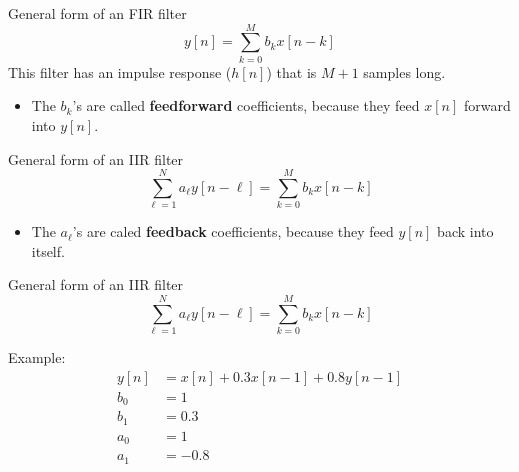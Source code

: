\documentclass{beamer}
\begin{document}
\begin{frame}
  \begin{block}{General form of an FIR filter}
    \[
    y[n] = \sum_{k=0}^{M} b_k x[n-k]
    \]
    This filter has an impulse response ($h[n]$) that is $M+1$ samples
    long.
    \begin{itemize}
    \item The $b_k$'s are called {\bf feedforward}
      coefficients, because they feed $x[n]$ forward into $y[n]$.
    \end{itemize}
  \end{block}
  \begin{block}{General form of an IIR filter}
    \[
    \sum_{\ell=1}^N a_\ell y[n-\ell] = \sum_{k=0}^{M} b_k x[n-k]
    \]
    \begin{itemize}
    \item %
      The $a_\ell$'s are caled
      {\bf feedback} coefficients, because they feed $y[n]$ back into
      itself.
    \end{itemize}
  \end{block}
\end{frame}

\begin{frame}
  \begin{block}{General form of an IIR filter}
    \[
    \sum_{\ell=1}^N a_\ell y[n-\ell] = \sum_{k=0}^{M} b_k x[n-k]
    \]
  \end{block}
  Example:
  \begin{align*}
    y[n] &= x[n] + 0.3 x[n-1] +  0.8 y[n-1]\\
    b_0 &= 1\\
    b_1 &= 0.3\\
    a_0 &= 1\\
    a_1 &= -0.8
  \end{align*}
\end{frame}
\end{document}
